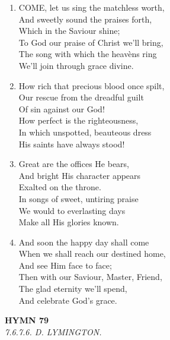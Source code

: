 \documentclass[11pt,a4paper]{article}
\begin{document}
\begin{enumerate}
    \item COME, let us sing the matchless worth, \\
        And sweetly sound the praises forth, \\
        Which in the Saviour shine; \\
        To God our praise of Christ we'll bring, \\
        The song with which the heav\`ens ring \\
        We'll join through grace divine.

    \item How rich that precious blood once spilt, \\
        Our rescue from the dreadful guilt \\
        Of sin against our God! \\
        How perfect is the righteousness, \\
        In which unspotted, beauteous dress \\
        His saints have always stood!

    \item Great are the offices He bears, \\
        And bright His character appears \\
        Exalted on the throne. \\
        In songs of sweet, untiring praise \\
        We would to everlasting days \\
        Make all His glories known.

    \item And soon the happy day shall come \\
        When we shall reach our destined home, \\
        And see Him face to face; \\
        Then with our Saviour, Master, Friend, \\
        The glad eternity we'll spend, \\
        And celebrate God's grace.

\end{enumerate}

\newpage
\begin{center}
    {\Large \textbf{HYMN 79}}
    \\
    \textit{7.6.7.6. D. LYMINGTON.}
\end{center}
\vspace{1em}
\end{document}
